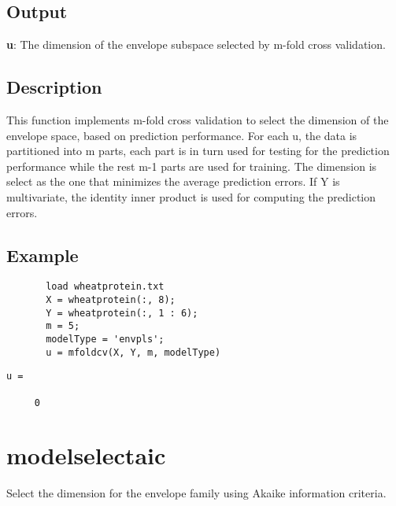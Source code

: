 \documentclass[a4paper,11pt,openany]{memoir}
\begin{document}
\subsection*{Output}

\begin{par}
\textbf{u}: The dimension of the envelope subspace selected by m-fold cross validation.
\end{par} \vspace{1em}
    

\subsection*{Description}

\begin{par}
This function implements m-fold cross validation to select the dimension of the envelope space, based on prediction performance.  For each u, the data is partitioned into m parts, each part is in turn used for testing for the prediction performance while the rest m-1 parts are used for training.  The dimension is select as the one that minimizes the average prediction errors. If Y is multivariate, the identity inner product is used for computing the prediction errors.
\end{par} \vspace{1em}


\subsection*{Example}


\begin{verbatim}       load wheatprotein.txt
       X = wheatprotein(:, 8);
       Y = wheatprotein(:, 1 : 6);
       m = 5;
       modelType = 'envpls';
       u = mfoldcv(X, Y, m, modelType)\end{verbatim}
    
        \color{lightgray} \ttfamily\begin{verbatim}
u =

     0

\end{verbatim}\rmfamily \color{black}

\newpage
    
\rmfamily
\color{black}\section{modelselectaic}

\begin{par}
Select the dimension for the envelope family using Akaike information criteria.
\end{par} \vspace{1em}
\end{document}
